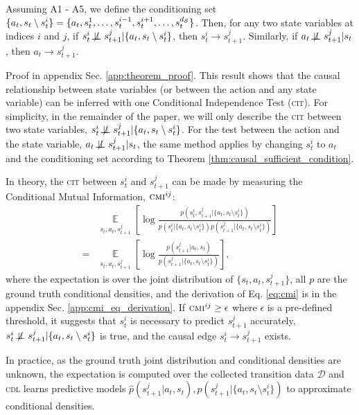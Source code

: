 \begin{theorem}
\label{thm:causal_sufficient_condition}
Assuming A1 - A5, we define the conditioning set $\{a_t, s_t \setminus s^i_t\}=\{a_t, s^1_t, \dots, s^{i-1}_t, s^{i+1}_t, \dots, s^{d_\mathcal{S}}_t\}$. Then, for any two state variables at indices $i$ and $j$, if $s_t^i \not\!\perp\!\!\!\perp s^j_{t+1} | \{a_t, s_t \setminus s^i_t\}$, then $s_t^i \rightarrow s^j_{t+1}$. Similarly, if $a_t \not\!\perp\!\!\!\perp s^j_{t+1} | s_t$, then $a_t \rightarrow s^j_{t+1}$.
\end{theorem}

Proof in appendix Sec. \ref{app:theorem_proof}. This result shows that the causal relationship between state variables (or between the action and any state variable) can be inferred with one Conditional Independence Test (\textsc{cit}). For simplicity, in the remainder of the paper, we will only describe the \textsc{cit} between two state variables, $s_t^i \not\!\perp\!\!\!\perp s^j_{t+1} | \{a_t, s_t \setminus s^i_t\}$. For the test between the action and the state variable, $a_t \not\!\perp\!\!\!\perp s^j_{t+1} | s_t$, the same method applies by changing $s_t^i$ to $a_t$ and the conditioning set according to Theorem \ref{thm:causal_sufficient_condition}. 

In theory, the \textsc{cit} between $s_t^i$ and $s^j_{t+1}$ can be made by measuring the Conditional Mutual Information, $\textsc{cmi}^{ij}$:
\begin{align}
\label{eq:cmi}
& \mathop{\mathbb{E}}\limits_{s_t,a_t,s^j_{t+1}}\left[\log\frac{p(s^i_t, s^j_{t+1} | \{a_t, s_t \setminus s^i_t\})}{p(s^i_t | \{a_t, s_t \setminus s^i_t\})p(s^j_{t+1} | \{a_t, s_t \setminus s^i_t\})}\right] \nonumber\\
=& \mathop{\mathbb{E}}\limits_{s_t,a_t,s^j_{t+1}}\left[\log\frac{p(s^j_{t+1} | a_t, s_t)}{p(s^j_{t+1} | \{a_t, s_t \setminus s^i_t\})}\right],
\end{align}
where the expectation is over the joint distribution of $\{s_t,a_t,s^j_{t+1}\}$, all $p$ are the ground truth conditional densities, and the derivation of Eq. \eqref{eq:cmi} is in the appendix Sec. \ref{app:cmi_eq_derivation}. If $\textsc{cmi}^{ij} \ge \epsilon$ where $\epsilon$ is a pre-defined threshold, it suggests that $s^i_t$ is necessary to predict $s^j_{t+1}$ accurately, $s_t^i \not\!\perp\!\!\!\perp s^j_{t+1} | \{a_t, s_t \setminus s^i_t\}$ is true, and the causal edge $s_t^i \rightarrow s^j_{t+1}$ exists.

In practice, as the ground truth joint distribution and conditional densities are unknown, the expectation is computed over the collected transition data $\mathcal{D}$ and \textsc{cdl} learns predictive models $\hat{p}(s^j_{t+1} | a_t, s_t), \hat{p}(s^j_{t+1} | \{a_t, s_t \setminus s^i_t\})$ to approximate conditional densities.

